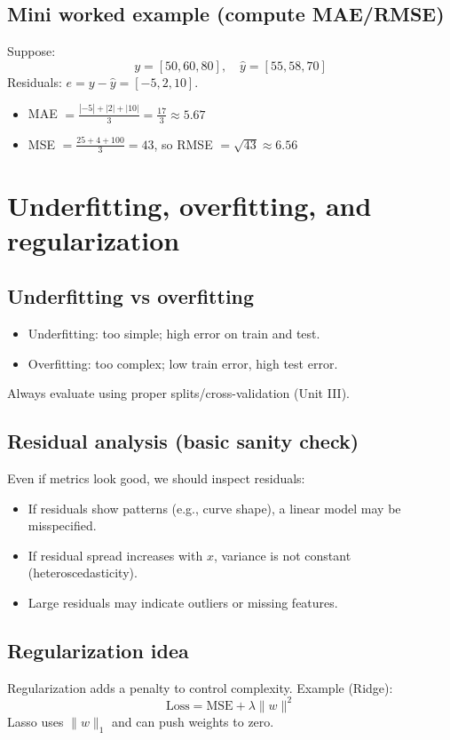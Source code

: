 \documentclass[11pt]{article}
\begin{document}
\subsection{Mini worked example (compute MAE/RMSE)}
Suppose:
\[
  y=[50,60,80],\quad \hat{y}=[55,58,70]
\]
Residuals: $e = y-\hat{y}=[-5,2,10]$.
\begin{itemize}[leftmargin=*]
  \item MAE $= \frac{|{-5}|+|2|+|10|}{3} = \frac{17}{3} \approx 5.67$
  \item MSE $= \frac{25+4+100}{3} = 43$, so RMSE $=\sqrt{43}\approx 6.56$
\end{itemize}

\section{Underfitting, overfitting, and regularization}
\subsection{Underfitting vs overfitting}
\begin{itemize}[leftmargin=*]
  \item Underfitting: too simple; high error on train and test.
  \item Overfitting: too complex; low train error, high test error.
\end{itemize}
Always evaluate using proper splits/cross-validation (Unit III).

\subsection{Residual analysis (basic sanity check)}
Even if metrics look good, we should inspect residuals:
\begin{itemize}[leftmargin=*]
  \item If residuals show patterns (e.g., curve shape), a linear model may be misspecified.
  \item If residual spread increases with $x$, variance is not constant (heteroscedasticity).
  \item Large residuals may indicate outliers or missing features.
\end{itemize}

\subsection{Regularization idea}
Regularization adds a penalty to control complexity. Example (Ridge):
\[
  \text{Loss} = \text{MSE} + \lambda \|w\|^2
\]
Lasso uses $\|w\|_1$ and can push weights to zero.
\end{document}
